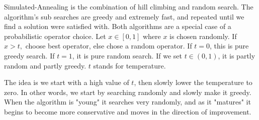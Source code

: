 \documentclass{chezarticle}
\begin{document}
\begin{algorithm}
Simulated-Annealing is the combination of hill climbing and random search. The algorithm's sub searches are greedy and extremely fast, and repeated until we find a solution were satisfied with. Both algorithms are a special case of a probabilistic operator choice. Let $x \in [0,1]$ where $x$ is chosen randomly. If $x > t,$ choose best operator, else   chose a random operator. If $t=0$, this is pure greedy search. If $t = 1$, it is pure random search. If we set $t \in (0,1)$, it is partly random and partly greedy. $t$ stands for temperature.
\end{algorithm}
The idea is we start with a high value of $t$, then slowly lower the temperature to zero. In other words, we start by searching randomly and slowly make it greedy. When the algorithm is "young" it searches very randomly, and as it "matures" it begins to become more conservative and moves in the direction of improvement. 
\end{document}

